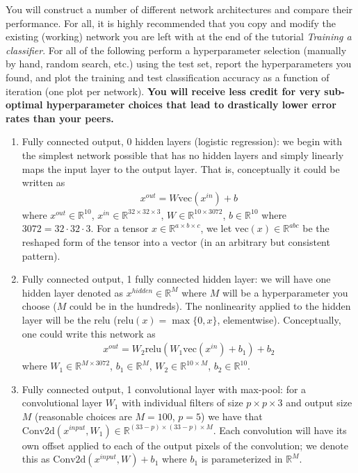 \documentclass{article}
\newcommand{\field}[1]{\mathbb{#1}}
\newcommand{\1}{\mathbf{1}}
\newcommand{\R}{\field{R}} %
\def\vec{\text{vec}}
\begin{document}
You will construct a number of different network architectures and compare their performance.
For all, it is highly recommended that you copy and modify the existing (working) network you are left with at the end of the tutorial \emph{Training a classifier}.
For all of the following perform a hyperparameter selection (manually by hand, random search, etc.) using the test set, report the hyperparameters you found, and plot the training and test classification accuracy as a function of iteration (one plot per network).
\textbf{You will receive less credit for very sub-optimal hyperparameter choices that lead to drastically lower error rates than your peers.}
\begin{enumerate}
  \item Fully connected output, 0 hidden layers (logistic regression): we begin with the simplest network possible that has no hidden layers and simply linearly maps the input layer to the output layer. That is, conceptually it could be written as 
  \begin{align*}
  x^{out} = W \vec(x^{in}) +b
  \end{align*} 
  where $x^{out} \in \R^{10}$, $x^{in} \in \R^{32 \times 32 \times 3}$, $W \in \R^{10 \times 3072}$, $b \in \R^{10}$ where $3072 = 32 \cdot 32 \cdot 3$. For a tensor $x \in \R^{a \times b \times c}$, we let $\vec(x) \in \R^{a b c}$ be the reshaped form of the tensor into a vector (in an arbitrary but consistent pattern). 
  \item Fully connected output, 1 fully connected hidden layer: we will have one hidden layer denoted as $x^{hidden} \in \R^{M}$ where $M$ will be a hyperparameter you choose ($M$ could be in the hundreds). The nonlinearity applied to the hidden layer will be the relu ($\mathrm{relu}(x) = \max\{0,x\}$, elementwise). Conceptually, one could write this network as 
  \begin{align*}
  x^{out} = W_2 \mathrm{relu}(W_1 \vec(x^{in}) +b_1) + b_2
  \end{align*}
  where $W_1 \in \R^{M \times 3072}$, $b_1 \in \R^M$, $W_2 \in \R^{10 \times M}$, $b_2 \in \R^{10}$.
  \item Fully connected output, 1 convolutional layer with max-pool: for a convolutional layer $W_1$ with individual filters of size $p \times p \times 3$ and output size $M$ (reasonable choices are $M=100$, $p=5$) we have that $\mathrm{Conv2d}(x^{input}, W_1) \in \R^{(33-p) \times (33-p) \times M}$. 
  Each convolution will have its own offset applied to each of the output pixels of the convolution; we denote this as $\mathrm{Conv2d}(x^{input}, W) + b_1$ where $b_1$ is parameterized in $\R^M$.

\end{enumerate}
\end{document}
